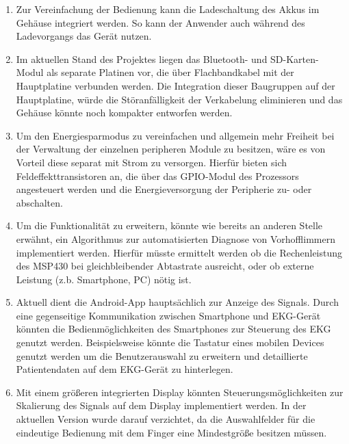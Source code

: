 \begin{enumerate}

\item Zur Vereinfachung der Bedienung kann die Ladeschaltung des Akkus im Gehäuse integriert werden. So kann der Anwender auch während des Ladevorgangs das Gerät nutzen.

\item Im aktuellen Stand des Projektes liegen das Bluetooth- und SD-Karten-Modul als separate Platinen vor, die über Flachbandkabel mit der Hauptplatine verbunden werden. Die Integration dieser Baugruppen auf der Hauptplatine, würde die Störanfälligkeit der Verkabelung eliminieren und das Gehäuse könnte noch kompakter entworfen werden.

\item Um den Energiesparmodus zu vereinfachen und allgemein mehr Freiheit bei der Verwaltung der einzelnen peripheren Module zu besitzen, wäre es von Vorteil diese separat mit Strom zu versorgen. Hierfür bieten sich Feldeffekttransistoren an, die über das GPIO-Modul des Prozessors angesteuert werden und die Energieversorgung der Peripherie zu- oder abschalten.

\item Um die Funktionalität zu erweitern, könnte wie bereits an anderen Stelle erwähnt, ein Algorithmus zur automatisierten Diagnose von Vorhofflimmern implementiert werden. Hierfür müsste ermittelt werden ob die Rechenleistung des MSP430 bei gleichbleibender Abtastrate ausreicht, oder ob externe Leistung (z.b. Smartphone, PC) nötig ist.

\item Aktuell dient die Android-App hauptsächlich zur Anzeige des Signals. Durch eine gegenseitige Kommunikation zwischen Smartphone und EKG-Gerät könnten die Bedienmöglichkeiten des Smartphones zur Steuerung des EKG genutzt werden. Beispielsweise könnte die Tastatur eines mobilen Devices genutzt werden um die Benutzerauswahl zu erweitern und detaillierte Patientendaten auf dem EKG-Gerät zu hinterlegen.

\item Mit einem größeren integrierten Display könnten Steuerungsmöglichkeiten zur Skalierung des Signals auf dem Display implementiert werden. In der aktuellen Version wurde darauf verzichtet, da die Auswahlfelder für die eindeutige Bedienung mit dem Finger eine Mindestgröße besitzen müssen.

\end{enumerate}